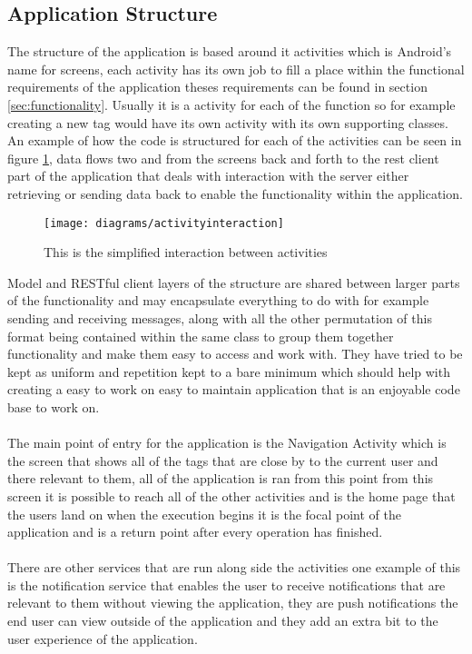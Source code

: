 \subsection{Application Structure}
\label{sec:android_application_structure}

The structure of the application is based around it activities which is Android's name for screens, each activity has its own job to fill a place within the functional requirements of the application theses requirements can be found in section \ref{sec:functionality}. Usually it is a activity for each of the function so for example creating a new tag would have its own activity with its own supporting classes. An example of how the code is structured for each of the activities can be seen in figure \ref{fig:activity_interation_image}, data flows two and from the screens back and forth to the rest client part of the application that deals with interaction with the server either retrieving or sending data back to enable the functionality within the application.\\

\begin{figure}[H]
    \centering
    \texttt{[image: diagrams/activityinteraction]}
    \caption{This is the simplified interaction between activities}
    \label{fig:activity_interation_image}
\end{figure} 

\noindent
Model and RESTful client layers of the structure are shared between larger parts of the functionality and may encapsulate everything to do with for example sending and receiving messages, along with all the other permutation of this format being contained within the same class to group them together functionality and make them easy to access and work with. They have tried to be kept as uniform and repetition kept to a bare minimum which should help with creating a easy to work on easy to maintain application that is an enjoyable code base to work on.\\
\\
The main point of entry for the application is the Navigation Activity which is the screen that shows all of the tags that are close by to the current user and there relevant to them, all of the application is ran from this point from this screen it is possible to reach all of the other activities and is the home page that the users land on when the execution begins it is the focal point of the application and is a return point after every operation has finished.\\
\\
There are other services that are run along side the activities one example of this is the notification service that enables the user to receive notifications that are relevant to them without viewing the application, they are push notifications the end user can view outside of the application and they add an extra bit to the user experience of the application.

